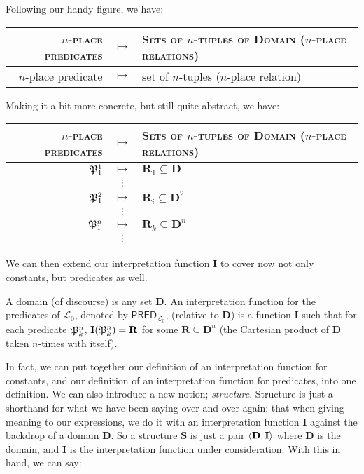 Following our handy figure, we have:

\begin{center}
	\begin{tabular}{rcl}
		$n$-\textsc{place predicates} & $\mapsto$ & \textsc{Sets of $n$-tuples of Domain ($n$-place relations)}\\\hline
		$n$-place predicate & $\mapsto$ & set of $n$-tuples ($n$-place relation)
	\end{tabular}
\end{center} 

Making it a bit more concrete, but still quite abstract, we have: 

\begin{center}
	\begin{tabular}{rcl}
		$n$-\textsc{place predicates} & $\mapsto$ & \textsc{Sets of $n$-tuples of Domain ($n$-place relations)}\\\hline
		$\mathfrak{P}^{1}_{1}$ & $\mapsto$ & $\mathbf{R}_1 \subseteq \mathbf{D}$\\
		& $\vdots$ &\\
		$\mathfrak{P}^{2}_{1}$ & $\mapsto$ & $\mathbf{R}_i \subseteq \mathbf{D}^2$\\
		& $\vdots$ &\\
		$\mathfrak{P}^{n}_{1}$ & $\mapsto$ & $\mathbf{R}_k \subseteq \mathbf{D}^n$\\
		& $\vdots$ &\\
	\end{tabular}
\end{center} 

We can then extend our interpretation function $\mathbf{I}$ to cover now not only constants, but predicates as well. 

\begin{defn}
A domain (of discourse) is any set $\mathbf{D}$. An interpretation function for the predicates of $\mathcal{L}_0$, denoted by $\mathsf{PRED}_{\mathcal{L}_0}$, (relative to $\mathbf{D}$) is a function $\mathbf{I}$ such that for each predicate $\mathfrak{P}^{n}_{k}$, $\mathbf{I}(\mathfrak{P}^{n}_{k})=\mathbf{R}$ for some $\mathbf{R} \subseteq \mathbf{D}^n$ (the Cartesian product of $\mathbf{D}$ taken $n$-times with itself). 
\end{defn}

In fact, we can put together our definition of an interpretation function for constants, and our definition of an interpretation function for predicates, into one definition. We can also introduce a new notion; \textit{structure}. Structure is just a shorthand for what we have been saying over and over again; that when giving meaning to our expressions, we do it with an interpretation function $\mathbf{I}$ against the backdrop of a domain $\mathbf{D}$. So a structure $\mathbf{S}$ is just a pair $\langle\mathbf{D}, \mathbf{I}\rangle$ where $\mathbf{D}$ is the domain, and $\mathbf{I}$ is the interpretation function under consideration. With this in hand, we can say: 

